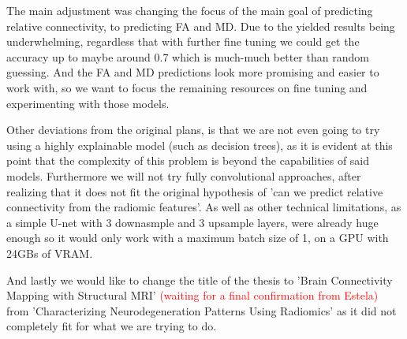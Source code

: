 
The main adjustment was changing the focus of the main goal of predicting relative connectivity, to predicting \ac{FA} and \ac{MD}. Due to the yielded results being underwhelming, regardless that with further fine tuning we could get the accuracy up to maybe around 0.7 which is much-much better than random guessing. And the \ac{FA} and \ac{MD} predictions look more promising and easier to work with, so we want to focus the remaining resources on fine tuning and experimenting with those models.\par

Other deviations from the original plans, is that we are not even going to try using a highly explainable model (such as decision trees), as it is evident at this point that the complexity of this problem is beyond the capabilities of said models. Furthermore we will not try fully convolutional approaches, after realizing that it does not fit the original hypothesis of 'can we predict relative connectivity from the radiomic features'. As well as other technical limitations, as a simple U-net with 3 downasmple and 3 upsample layers, were already huge enough so it would only work with a maximum batch size of 1, on a GPU with 24GBs of VRAM.\par

And lastly we would like to change the title of the thesis to 'Brain Connectivity Mapping with Structural MRI' \textcolor{red}{(waiting for a final confirmation from Estela)} from 'Characterizing Neurodegeneration Patterns Using Radiomics' as it did not completely fit for what we are trying to do.